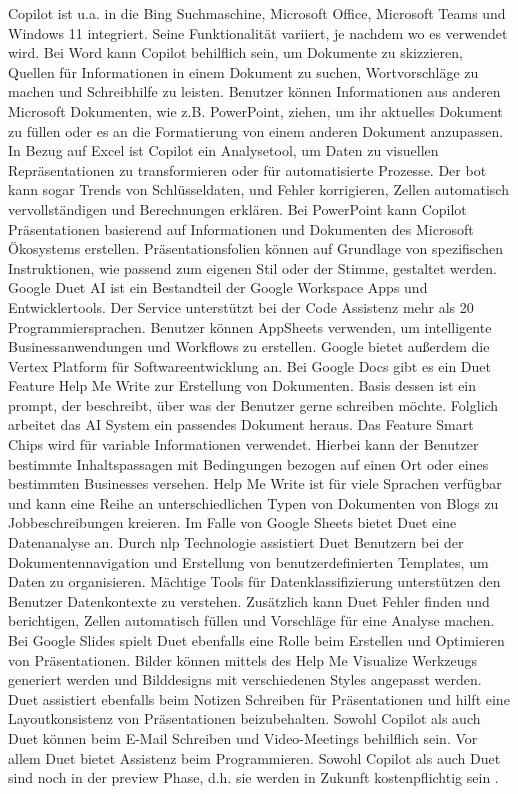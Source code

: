 Copilot ist u.a. in die Bing Suchmaschine, Microsoft Office, Microsoft Teams und Windows 11 integriert. Seine Funktionalität variiert, je nachdem wo es verwendet wird. Bei Word kann Copilot behilflich sein, um Dokumente zu skizzieren, Quellen für Informationen in einem Dokument zu suchen, Wortvorschläge zu machen und Schreibhilfe zu leisten. Benutzer können Informationen aus anderen Microsoft Dokumenten, wie z.B. PowerPoint, ziehen, um ihr aktuelles Dokument zu füllen oder es an die Formatierung von einem anderen Dokument anzupassen. In Bezug auf Excel ist Copilot ein Analysetool, um Daten zu visuellen Repräsentationen zu transformieren oder für automatisierte Prozesse. Der bot kann sogar Trends von Schlüsseldaten, und Fehler korrigieren, Zellen automatisch vervollständigen und Berechnungen erklären. Bei PowerPoint kann Copilot Präsentationen basierend auf Informationen und Dokumenten des Microsoft Ökosystems erstellen. Präsentationsfolien können auf Grundlage von spezifischen Instruktionen, wie passend zum eigenen Stil oder der Stimme, gestaltet werden. Google Duet AI ist ein Bestandteil der Google Workspace Apps und Entwicklertools. Der Service unterstützt bei der Code Assistenz mehr als 20 Programmiersprachen. Benutzer können AppSheets verwenden, um intelligente Businessanwendungen und Workflows zu erstellen. Google bietet außerdem die Vertex Platform für Softwareentwicklung an. Bei Google Docs gibt es ein Duet Feature Help Me Write zur Erstellung von Dokumenten. Basis dessen ist ein prompt, der beschreibt, über was der Benutzer gerne schreiben möchte. Folglich arbeitet das AI System ein passendes Dokument heraus. Das Feature Smart Chips wird für variable Informationen verwendet. Hierbei kann der Benutzer bestimmte Inhaltspassagen mit Bedingungen bezogen auf einen Ort oder eines bestimmten Businesses versehen. Help Me Write ist für viele Sprachen verfügbar und kann eine Reihe an unterschiedlichen Typen von Dokumenten von Blogs zu Jobbeschreibungen kreieren. Im Falle von Google Sheets bietet Duet eine Datenanalyse an. Durch \gls{nlp} Technologie assistiert Duet Benutzern bei der Dokumentennavigation und Erstellung von benutzerdefinierten Templates, um Daten zu organisieren. Mächtige Tools für Datenklassifizierung unterstützen den Benutzer Datenkontexte zu verstehen. Zusätzlich kann Duet Fehler finden und berichtigen, Zellen automatisch füllen und Vorschläge für eine Analyse machen. Bei Google Slides spielt Duet ebenfalls eine Rolle beim Erstellen und Optimieren von Präsentationen. Bilder können mittels des Help Me Visualize Werkzeugs generiert werden und Bilddesigns mit verschiedenen Styles angepasst werden. Duet assistiert ebenfalls beim Notizen Schreiben für Präsentationen und hilft eine Layoutkonsistenz von Präsentationen beizubehalten. Sowohl Copilot als auch Duet können beim E-Mail Schreiben und Video-Meetings behilflich sein. Vor allem Duet bietet Assistenz beim Programmieren. Sowohl Copilot als auch Duet sind noch in der preview Phase, d.h. sie werden in Zukunft kostenpflichtig sein \cite{copilot-duet}. \\
